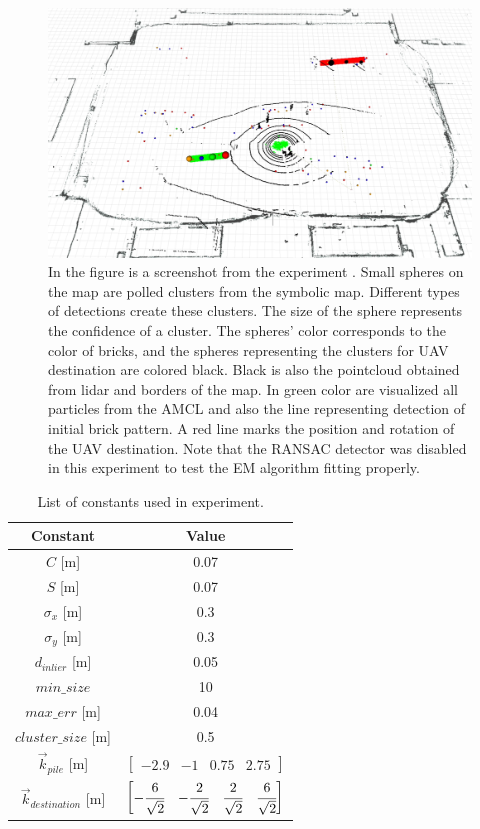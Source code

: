\begin{figure}[H]
	\centering
	\includegraphics[scale=0.3]{fig/experiment}
	\caption[Experiment results]{In the figure is a screenshot from the experiment \footnotemark. Small spheres on the map are polled clusters from the symbolic map. Different types of detections create these clusters. The size of the sphere represents the confidence of a cluster. The spheres' color corresponds to the color of bricks, and the spheres representing the clusters for UAV destination are colored black. Black is also the pointcloud obtained from lidar and borders of the map. In green color are visualized all particles from the AMCL and also the line representing detection of initial brick pattern. A red line marks the position and rotation of the UAV destination. Note that the RANSAC detector was disabled in this experiment to test the EM algorithm fitting properly.}
	\label{fig:experiment}
\end{figure}

\begin{table}[H]
	\centering
	\caption{List of constants used in experiment.}
	\begin{tabular}{cc}
		\toprule
		Constant & Value \\
		\midrule
		$C$ [m] & 0.07   \\ 
		$S$ [m] & 0.07  \\
		$\sigma_x$ [m] & 0.3 \\ 
		$\sigma_y$ [m] & 0.3 \\
		$d_{inlier}$ [m] & 0.05 \\ 
		$min\_size$ & 10 \\
		$max\_err$ [m] & 0.04 \\
		$cluster\_size$ [m] & 0.5 \\
		$\vec{k}_{pile} $ [m] & $\begin{bmatrix}
			-2.9 & -1 & 0.75 & 2.75
		\end{bmatrix}$ \\
		$\vec{k}_{destination}$ [m] &
		$\begin{bmatrix}
			-\cfrac{6}{\sqrt{2}} &  -\cfrac{2}{\sqrt{2}} &  \cfrac{2}{\sqrt{2}} &  \cfrac{6}{\sqrt{2}}
		\end{bmatrix}$ \\
		\bottomrule
	\end{tabular}
	\label{tab:constants}
\end{table}

